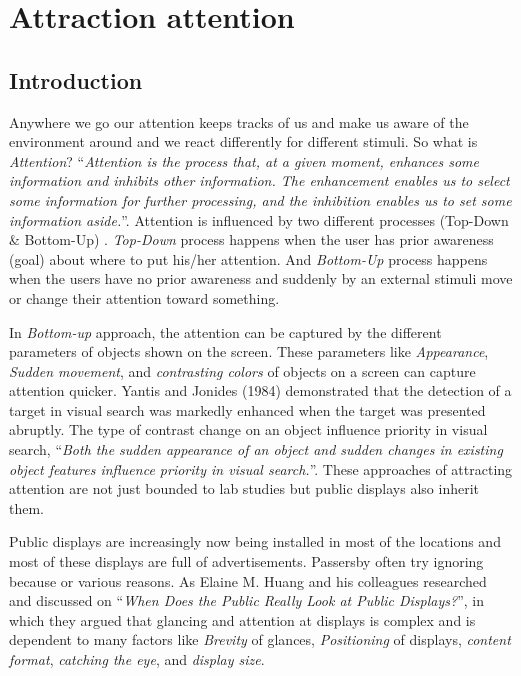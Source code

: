 
\chapter{Attraction attention} %


\label{Chapter3} %
\newpage

\section{Introduction}

Anywhere we go our attention keeps tracks of us and make us aware of the environment around and we react differently for different stimuli. So what is \emph{Attention}? ``\emph{Attention is the process that, at a given moment, enhances some information and inhibits other information. The enhancement enables us to select some information for further processing, and the inhibition enables us to set some information aside.}''\cite{Attention}. Attention is influenced by two different processes (Top-Down \& Bottom-Up) \cite{attention1,Attention}. \emph{Top-Down} process happens when the user has prior awareness (goal) about where to put his/her attention. And \emph{Bottom-Up} process happens when the users have no prior awareness and suddenly by an external stimuli move or change their attention toward something. 

In \emph{Bottom-up} approach, the attention can be captured by the different parameters of objects shown on the screen. These parameters like \emph{Appearance}, \emph{Sudden movement}, and \emph{contrasting colors} of objects on a screen can capture attention quicker. Yantis and Jonides (1984) demonstrated that the detection of a target in visual search was markedly enhanced when the target was presented abruptly\cite{capturingattention}. The type of contrast change on an object influence priority in visual search, ``\emph{Both the sudden appearance of an object and sudden changes in existing object features influence priority in visual search.}''\cite{Luminance}. These approaches of attracting attention are not just bounded to lab studies but public displays also inherit them. 

Public displays are increasingly now being installed in most of the locations and most of these displays are full of advertisements. Passersby often try ignoring because or various reasons. As Elaine M. Huang and his colleagues researched and discussed on ``\emph{When Does the Public Really Look at Public Displays?}''\cite{WhenPublicDisplays}, in which they argued that glancing and attention at displays is complex and is dependent to many factors like \emph{Brevity} of glances, \emph{Positioning} of displays, \emph{content format}, \emph{catching the eye}, and \emph{display size}. 

